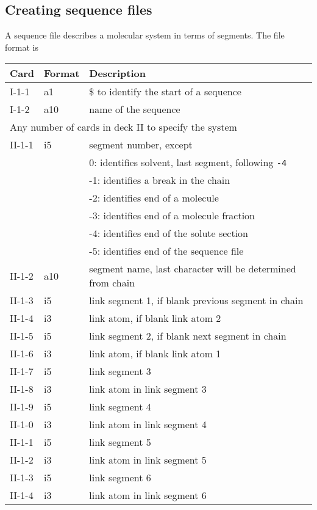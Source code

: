 \subsection{Creating sequence files}
A sequence file describes a molecular system in terms of segments. The
file format is
\begin{center}
\begin{tabular*}{150mm}{p{12mm}p{12mm}l}
\hline\hline
Card & Format & Description \\ \hline
I-1-1  & a1     & \$ to identify the start of a sequence \\
I-1-2  & a10    & name of the sequence\\
\multicolumn{3}{l}{Any number of cards in deck II to specify the system} \\
II-1-1 & i5     & segment number, except\\
       &        &  0: identifies solvent, last segment, following \verb+-4+\\
       &        & -1: identifies a break in the chain\\
       &        & -2: identifies end of a molecule\\
       &        & -3: identifies end of a molecule fraction\\
       &        & -4: identifies end of the solute section\\
       &        & -5: identifies end of the sequence file\\
II-1-2 & a10    & segment name, last character will be determined from chain\\
II-1-3 & i5     & link segment 1, if blank previous segment in chain\\
II-1-4 & i3     & link atom, if blank link atom 2\\
II-1-5 & i5     & link segment 2, if blank next segment in chain\\
II-1-6 & i3     & link atom, if blank link atom 1\\
II-1-7 & i5     & link segment 3\\
II-1-8 & i3     & link atom in link segment 3\\
II-1-9 & i5     & link segment 4\\
II-1-0 & i3     & link atom in link segment 4\\
II-1-1 & i5     & link segment 5\\
II-1-2 & i3     & link atom in link segment 5\\
II-1-3 & i5     & link segment 6\\
II-1-4 & i3     & link atom in link segment 6\\

\end{tabular*}
\end{center}
